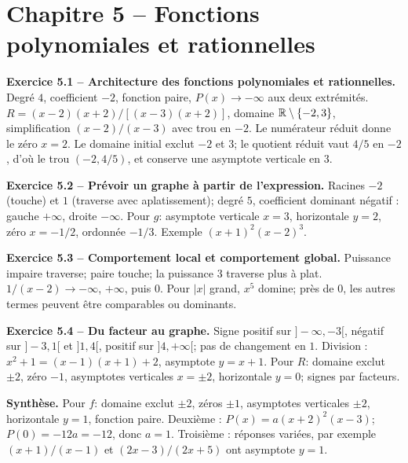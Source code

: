 \chapter*{Chapitre 5 -- Fonctions polynomiales et rationnelles}
\begin{answerbox}
\textbf{Exercice 5.1 -- Architecture des fonctions polynomiales et rationnelles.} Degré $4$, coefficient $-2$, fonction paire, $P(x)\to-\infty$ aux deux extrémités. $R=(x-2)(x+2)/[(x-3)(x+2)]$, domaine $\mathbb{R}\setminus\{-2,3\}$, simplification $(x-2)/(x-3)$ avec trou en $-2$. Le numérateur réduit donne le zéro $x=2$. Le domaine initial exclut $-2$ et $3$; le quotient réduit vaut $4/5$ en $-2$, d'où le trou $(-2,4/5)$, et conserve une asymptote verticale en $3$.\par
\textbf{Exercice 5.2 -- Prévoir un graphe à partir de l'expression.} Racines $-2$ (touche) et $1$ (traverse avec aplatissement); degré $5$, coefficient dominant négatif : gauche $+\infty$, droite $-\infty$. Pour $g$: asymptote verticale $x=3$, horizontale $y=2$, zéro $x=-1/2$, ordonnée $-1/3$. Exemple $(x+1)^2(x-2)^3$.\par
\textbf{Exercice 5.3 -- Comportement local et comportement global.} Puissance impaire traverse; paire touche; la puissance $3$ traverse plus à plat. $1/(x-2)\to-\infty$, $+\infty$, puis $0$. Pour $|x|$ grand, $x^5$ domine; près de $0$, les autres termes peuvent être comparables ou dominants.\par
\textbf{Exercice 5.4 -- Du facteur au graphe.} Signe positif sur $]-\infty,-3[$, négatif sur $]-3,1[$ et $]1,4[$, positif sur $]4,+\infty[$; pas de changement en $1$. Division : $x^2+1=(x-1)(x+1)+2$, asymptote $y=x+1$. Pour $R$: domaine exclut $\pm2$, zéro $-1$, asymptotes verticales $x=\pm2$, horizontale $y=0$; signes par facteurs.\par
\medskip\textbf{Synthèse.} Pour $f$: domaine exclut $\pm2$, zéros $\pm1$, asymptotes verticales $\pm2$, horizontale $y=1$, fonction paire. Deuxième : $P(x)=a(x+2)^2(x-3)$; $P(0)=-12a=-12$, donc $a=1$. Troisième : réponses variées, par exemple $(x+1)/(x-1)$ et $(2x-3)/(2x+5)$ ont asymptote $y=1$.
\end{answerbox}
